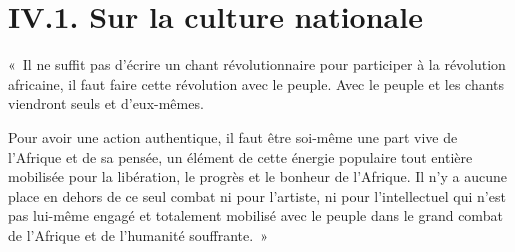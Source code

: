 \documentclass[french,twoside]{book} %
\begin{document}
\section[{IV.1. Sur la culture nationale}]{IV.1. Sur la culture nationale}
\noindent « Il ne suffit pas d’écrire un chant révolutionnaire pour participer à la révolution africaine, il faut faire cette révolution avec le peuple. Avec le peuple et les chants viendront seuls et d’eux-mêmes.\par
Pour avoir une action authentique, il faut être soi-même une part vive de l’Afrique et de sa pensée, un élément de cette énergie populaire tout entière mobilisée pour la libération, le progrès et le bonheur de l’Afrique. Il n’y a aucune place en dehors de ce seul combat ni pour l’artiste, ni pour l’intellectuel qui n’est pas lui-même engagé et totalement mobilisé avec le peuple dans le grand combat de l’Afrique et de l’humanité souffrante. »
\end{document}
